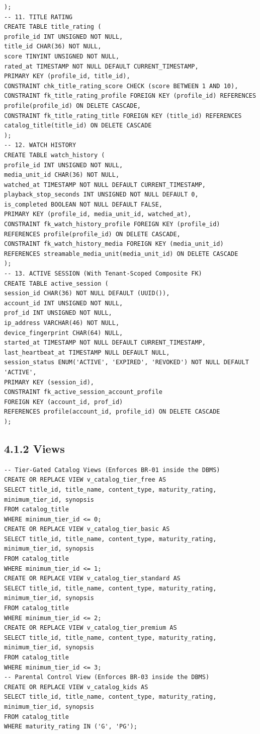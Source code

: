 \begin{lstlisting}[style=reportsql,title={Schema DDL}]
);
-- 11. TITLE RATING
CREATE TABLE title_rating (
profile_id INT UNSIGNED NOT NULL,
title_id CHAR(36) NOT NULL,
score TINYINT UNSIGNED NOT NULL,
rated_at TIMESTAMP NOT NULL DEFAULT CURRENT_TIMESTAMP,
PRIMARY KEY (profile_id, title_id),
CONSTRAINT chk_title_rating_score CHECK (score BETWEEN 1 AND 10),
CONSTRAINT fk_title_rating_profile FOREIGN KEY (profile_id) REFERENCES profile(profile_id) ON DELETE CASCADE,
CONSTRAINT fk_title_rating_title FOREIGN KEY (title_id) REFERENCES catalog_title(title_id) ON DELETE CASCADE
);
-- 12. WATCH HISTORY
CREATE TABLE watch_history (
profile_id INT UNSIGNED NOT NULL,
media_unit_id CHAR(36) NOT NULL,
watched_at TIMESTAMP NOT NULL DEFAULT CURRENT_TIMESTAMP,
playback_stop_seconds INT UNSIGNED NOT NULL DEFAULT 0,
is_completed BOOLEAN NOT NULL DEFAULT FALSE,
PRIMARY KEY (profile_id, media_unit_id, watched_at),
CONSTRAINT fk_watch_history_profile FOREIGN KEY (profile_id) REFERENCES profile(profile_id) ON DELETE CASCADE,
CONSTRAINT fk_watch_history_media FOREIGN KEY (media_unit_id) REFERENCES streamable_media_unit(media_unit_id) ON DELETE CASCADE
);
-- 13. ACTIVE SESSION (With Tenant-Scoped Composite FK)
CREATE TABLE active_session (
session_id CHAR(36) NOT NULL DEFAULT (UUID()),
account_id INT UNSIGNED NOT NULL,
prof_id INT UNSIGNED NOT NULL,
ip_address VARCHAR(46) NOT NULL,
device_fingerprint CHAR(64) NULL,
started_at TIMESTAMP NOT NULL DEFAULT CURRENT_TIMESTAMP,
last_heartbeat_at TIMESTAMP NULL DEFAULT NULL,
session_status ENUM('ACTIVE', 'EXPIRED', 'REVOKED') NOT NULL DEFAULT 'ACTIVE',
PRIMARY KEY (session_id),
CONSTRAINT fk_active_session_account_profile
FOREIGN KEY (account_id, prof_id)
REFERENCES profile(account_id, profile_id) ON DELETE CASCADE
);
\end{lstlisting}

\subsection*{4.1.2 Views}

\begin{lstlisting}[style=reportsql,title={Catalog views}]
-- Tier-Gated Catalog Views (Enforces BR-01 inside the DBMS)
CREATE OR REPLACE VIEW v_catalog_tier_free AS
SELECT title_id, title_name, content_type, maturity_rating, minimum_tier_id, synopsis
FROM catalog_title
WHERE minimum_tier_id <= 0;
CREATE OR REPLACE VIEW v_catalog_tier_basic AS
SELECT title_id, title_name, content_type, maturity_rating, minimum_tier_id, synopsis
FROM catalog_title
WHERE minimum_tier_id <= 1;
CREATE OR REPLACE VIEW v_catalog_tier_standard AS
SELECT title_id, title_name, content_type, maturity_rating, minimum_tier_id, synopsis
FROM catalog_title
WHERE minimum_tier_id <= 2;
CREATE OR REPLACE VIEW v_catalog_tier_premium AS
SELECT title_id, title_name, content_type, maturity_rating, minimum_tier_id, synopsis
FROM catalog_title
WHERE minimum_tier_id <= 3;
-- Parental Control View (Enforces BR-03 inside the DBMS)
CREATE OR REPLACE VIEW v_catalog_kids AS
SELECT title_id, title_name, content_type, maturity_rating, minimum_tier_id, synopsis
FROM catalog_title
WHERE maturity_rating IN ('G', 'PG');
\end{lstlisting}

